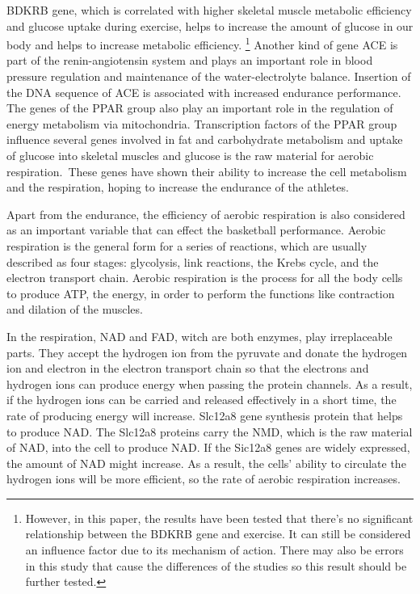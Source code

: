 \documentclass[man,floatsintext]{apa7}
\begin{document}
BDKRB gene, which is correlated with higher skeletal muscle metabolic efficiency and glucose uptake during exercise, helps to increase the amount of glucose in our body and helps to increase metabolic efficiency.\autocite{mareksawczukPolymorphismBradykininReceptor2013} \footnote{However, in this paper, the results have been tested that there's no significant relationship between the BDKRB gene and exercise. It can still be considered an influence factor due to its mechanism of action. There may also be errors in this study that cause the differences of the studies so this result should be further tested.} Another kind of gene ACE is part of the renin-angiotensin system and plays an important role in blood pressure regulation and maintenance of the water-electrolyte balance.\autocite{loefflerBiochemieUndPathobiochemie2019} Insertion of the DNA sequence of ACE is associated with increased endurance performance. The genes of the PPAR group also play an important role in the regulation of energy metabolism via mitochondria. Transcription factors of the PPAR group influence several genes involved in fat and carbohydrate metabolism and uptake of glucose into skeletal muscles \autocite{loefflerBiochemieUndPathobiochemie2019} and glucose is the raw material for aerobic respiration. These genes have shown their ability to increase the cell metabolism and the respiration, hoping to increase the endurance of the athletes.

Apart from the endurance, the efficiency of aerobic respiration is also considered as an important variable that can effect the basketball performance. Aerobic respiration is the general form for a series of reactions, which are usually described as four stages: glycolysis, link reactions, the Krebs cycle, and the electron transport chain. Aerobic respiration is the process for all the body cells to produce ATP, the energy, in order to perform the functions like contraction and dilation of the muscles. 

In the respiration, NAD and FAD, witch are both enzymes, play irreplaceable parts. They accept the hydrogen ion from the pyruvate and donate the hydrogen ion and electron in the electron transport chain so that the electrons and hydrogen ions can produce energy when passing the protein channels. As a result, if the hydrogen ions can be carried and released effectively in a short time, the rate of producing energy will increase. Slc12a8 gene synthesis protein that helps to produce NAD. The Slc12a8 proteins carry the NMD, which is the raw material of NAD, into the cell to produce NAD. \autocite{grozioSlc12a8NicotinamideMononucleotide2019} If the Sic12a8 genes are widely expressed, the amount of NAD might increase. As a result, the cells' ability to circulate the hydrogen ions will be more efficient, so the rate of aerobic respiration increases.
\end{document}
